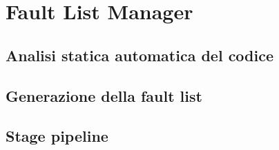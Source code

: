 \section{Fault List Manager}\label{sec:FLM}

\subsection{Analisi statica automatica del codice}

\subsection{Generazione della fault list}

\subsection{Stage pipeline}
